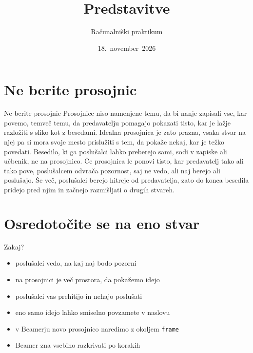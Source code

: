 \documentclass{beamer}
\title{Predstavitve}
\author{Računalniški praktikum}
\date{18.~november~2026}
\begin{document}
\begin{frame}
  \titlepage
\end{frame}

\section{Ne berite prosojnic}

\begin{frame}{Ne berite prosojnic}
  Prosojnice niso namenjene temu, da bi nanje zapisali vse, kar
  povemo, temveč temu, da predavatelju pomagajo pokazati tisto, kar je
  lažje razložiti s sliko kot z besedami. Idealna prosojnica je zato
  prazna, vsaka stvar na njej pa si mora svoje mesto prislužiti s tem,
  da pokaže nekaj, kar je težko povedati. Besedilo, ki ga poslušalci
  lahko preberejo sami, sodi v zapiske ali učbenik, ne na prosojnico.
  Če prosojnica le ponovi tisto, kar predavatelj tako ali tako pove,
  poslušalcem odvrača pozornost, saj ne vedo, ali naj berejo ali
  poslušajo. Še več, poslušalci berejo hitreje od predavatelja, zato
  do konca besedila pridejo pred njim in začnejo razmišljati o drugih
  stvareh.
\end{frame}

\section{Osredotočite se na eno stvar}

\begin{frame}{Zakaj?}
  \begin{itemize}
    \item poslušalci vedo, na kaj naj bodo pozorni
    \item na prosojnici je več prostora, da pokažemo idejo
    \item poslušalci vas prehitijo in nehajo poslušati
    \item eno samo idejo lahko smiselno povzamete v naslovu
    \item v Beamerju novo prosojnico naredimo z okoljem \texttt{frame}
    \item Beamer zna vsebino razkrivati po korakih
  \end{itemize}
\end{frame}
\end{document}
